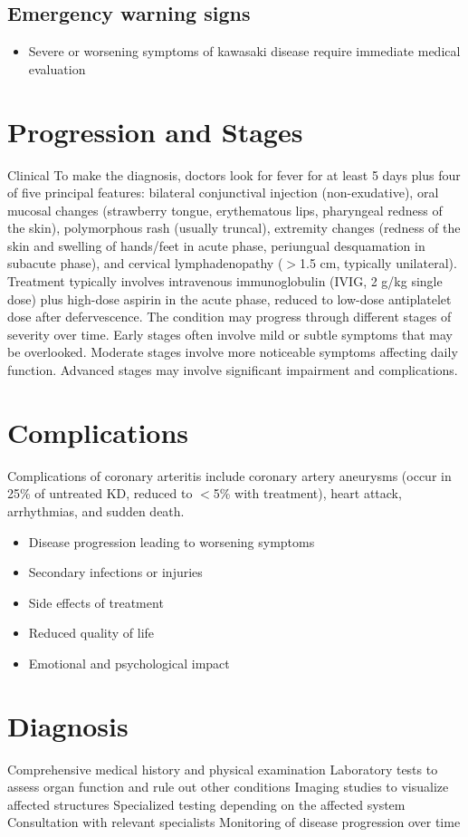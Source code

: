 \subsection{Emergency warning signs}
\begin{itemize}[noitemsep]
  \item Severe or worsening symptoms of kawasaki disease require immediate medical evaluation
\end{itemize}
\section{Progression and Stages}
Clinical To make the diagnosis, doctors look for fever for at least 5 days plus four of five principal features: bilateral conjunctival injection (non-exudative), oral mucosal changes (strawberry tongue, erythematous lips, pharyngeal redness of the skin), polymorphous rash (usually truncal), extremity changes (redness of the skin and swelling of hands/feet in acute phase, periungual desquamation in subacute phase), and cervical lymphadenopathy ($>$1.5 cm, typically unilateral). Treatment typically involves intravenous immunoglobulin (IVIG, 2 g/kg single dose) plus high-dose aspirin in the acute phase, reduced to low-dose antiplatelet dose after defervescence. The condition may progress through different stages of severity over time. Early stages often involve mild or subtle symptoms that may be overlooked. Moderate stages involve more noticeable symptoms affecting daily function. Advanced stages may involve significant impairment and complications.
\section{Complications}
Complications of coronary arteritis include coronary artery aneurysms (occur in 25\% of untreated KD, reduced to $<$5\% with treatment), heart attack, arrhythmias, and sudden death.

\begin{itemize}[noitemsep]
  \item Disease progression leading to worsening symptoms
  \item Secondary infections or injuries
  \item Side effects of treatment
  \item Reduced quality of life
  \item Emotional and psychological impact
\end{itemize}
\section{Diagnosis}
Comprehensive medical history and physical examination Laboratory tests to assess organ function and rule out other conditions Imaging studies to visualize affected structures Specialized testing depending on the affected system Consultation with relevant specialists Monitoring of disease progression over time

